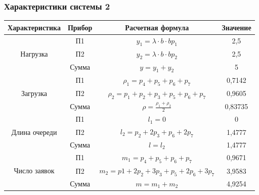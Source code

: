 \subsubsection{Характеристики системы 2}
\begin{tabular}{|c|c|c|c|}
\hline
Характеристика                      & Прибор & Расчетная формула                                                       & Значение \\ \hline
\multirow{3}{*}{Нагрузка}           & П1     & $y_1 = \lambda\cdot b\cdot b p_1$                                       & 2,5      \\ \cline{2-4}
                                    & П2     & $y_2 = \lambda\cdot b\cdot b p_2$                                       & 2,5      \\ \cline{2-4}
                                    & Сумма  & $y = y_1 + y_2$                                                         & 5        \\ \hline
\multirow{3}{*}{Загрузка}           & П1     & $\rho_1 = p_4 + p_5 + p_6 + p_7$                                        & 0,7142   \\ \cline{2-4}
                                    & П2     & $\rho_2 = p_1 + p_2 + p_3 + p_5 + p_6 + p_7$                            & 0,9605   \\ \cline{2-4}
                                    & Сумма  & $\rho = \frac{\rho_1 + \rho_2}{2}$                                      & 0,83735  \\ \hline
\multirow{3}{*}{Длина очереди}      & П1     & $l_1 = 0$                                                               & 0        \\ \cline{2-4}
                                    & П2     & $l_2 = p_2 + 2p_3 + p_6 + 2p_7$                                         & 1,4777   \\ \cline{2-4}
                                    & Сумма  & $l = l_2$                                                               & 1,4777   \\ \hline
\multirow{3}{*}{Число заявок}       & П1     & $m_1 = p_4 + p_5 + p_6 + p_7$                                           & 0,9671   \\ \cline{2-4}
                                    & П2     & $m_2 = p1 + 2p_2 + 3p_3 + p_5 + 2p_6 + 3p_7$                            & 3,9583   \\ \cline{2-4}
                                    & Сумма  & $m = m_1 + m_2$                                                         & 4,9254   \\ \hline

\end{tabular}
